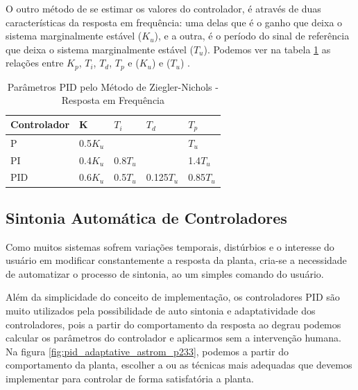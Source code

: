 O outro método de se estimar os valores do controlador, é através de duas características da resposta em frequência: uma delas que é o ganho que deixa o sistema marginalmente estável ($K_u$), e a outra, é o período do sinal de referência que deixa o sistema marginalmente estável ($T_u$). Podemos ver na tabela \ref{tab:Ziegler-Nichols-freq} as relações entre $K_p$, $T_i$, $T_d$, $T_p$ e ($K_u$) e ($T_u$) . 

\begin{table}
  \caption{Parâmetros PID pelo Método de Ziegler-Nichols - Resposta em Frequência}
  \label{tab:Ziegler-Nichols-freq}
  \centering%
  \begin{minipage}{.52\textwidth}
    \begin{tabular*}{\textwidth}{lllll}
      \hline
      {Controlador} & {K} & {$T_i$} & {$T_d$}& {$T_p$}\\ \hline
      \hline
      P    &  0.5$K_u$   &           &             & $T_u$  \\ 
      PI   &  0.4$K_u$   & 0.8$T_u$  &             & 1.4$T_u$ \\
      PID  &  0.6$K_u$   & 0.5$T_u$  & 0.125$T_u$  & 0.85$T_u$  \\ \hline
    \end{tabular*}
  \end{minipage}
\end{table}

\subsection{Sintonia Automática de Controladores}


Como muitos sistemas sofrem variações temporais, distúrbios e o interesse do usuário em modificar constantemente a resposta da planta, cria-se a necessidade de automatizar o processo de sintonia, ao um simples comando do usuário.

Além da simplicidade do conceito de implementação, os controladores PID são muito utilizados pela possibilidade de auto sintonia e adaptatividade dos controladores, pois a partir do comportamento da resposta ao degrau podemos calcular os parâmetros do controlador e aplicarmos sem a intervenção humana\cite{Astrom1995}. Na figura \ref{fig:pid_adaptative_astrom_p233}, podemos a partir do comportamento da planta, escolher a ou as técnicas mais adequadas que devemos implementar para controlar de forma satisfatória a planta.

